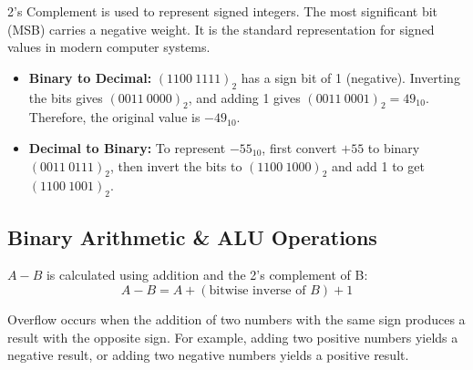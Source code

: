 \begin{remark}
2's Complement is used to represent signed integers. The most significant bit (MSB) carries a negative weight. It is the standard representation for signed values in modern computer systems.
\end{remark}

\begin{example}

\begin{itemize}
    \item \textbf{Binary to Decimal:} $(1100\ 1111)_2$ has a sign bit of 1 (negative). Inverting the bits gives $(0011\ 0000)_2$, and adding 1 gives $(0011\ 0001)_2 = 49_{10}$. Therefore, the original value is $-49_{10}$.
    \item \textbf{Decimal to Binary:} To represent $-55_{10}$, first convert $+55$ to binary $(0011\ 0111)_2$, then invert the bits to $(1100\ 1000)_2$ and add 1 to get $(1100\ 1001)_2$.
\end{itemize}

\end{example}

\subsection{Binary Arithmetic \& ALU Operations}

\begin{remark}
$A - B$ is calculated using addition and the 2's complement of B:
\begin{equation}
A - B = A + (\text{bitwise inverse of } B) + 1
\end{equation}
\end{remark}

\begin{remark}
Overflow occurs when the addition of two numbers with the same sign produces a result with the opposite sign. For example, adding two positive numbers yields a negative result, or adding two negative numbers yields a positive result.
\end{remark}


